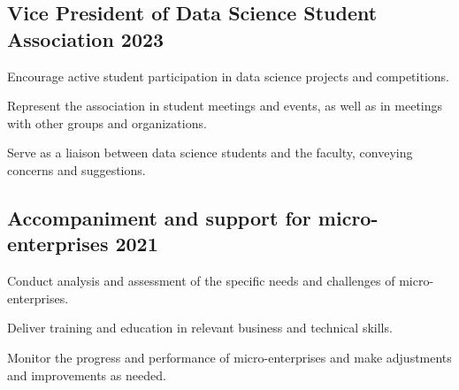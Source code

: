 
\subsection{{Vice President of Data Science Student Association \hfill 2023}}
\begin{zitemize}
\item Encourage active student participation in data science projects and competitions.
\item Represent the association in student meetings and events, as well as in meetings with other groups and organizations.
\item Serve as a liaison between data science students and the faculty, conveying concerns and suggestions.

\end{zitemize}

\subsection{{Accompaniment and support for micro-enterprises \hfill 2021}}
\begin{zitemize}
\item Conduct analysis and assessment of the specific needs and challenges of micro-enterprises.
\item Deliver training and education in relevant business and technical skills.
\item Monitor the progress and performance of micro-enterprises and make adjustments and improvements as needed.

\end{zitemize}